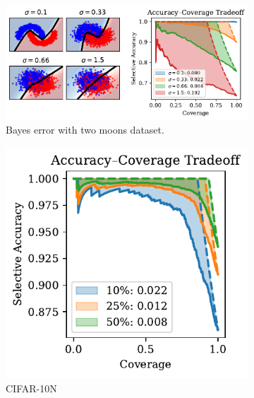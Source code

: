\begin{figure}[t]
  \centering
  \begin{subfigure}[t]{0.49\textwidth}
  \centering
    \includegraphics[width=\linewidth]{figs/sc_bounds/2moons_bayes.pdf}%
    \caption{Bayes error with two moons dataset.}
    \label{fig:left}
  \end{subfigure}
  \begin{subfigure}[t]{0.24\textwidth}
    \centering
    \includegraphics[width=\linewidth]{figs/sc_bounds/cifar10_noisy_tradeoff.pdf}
    \caption{CIFAR-10N}
    \label{fig:right}
  \end{subfigure}
  \begin{subfigure}[t]{0.24\textwidth}
    \centering

\end{subfigure}
\end{figure}
